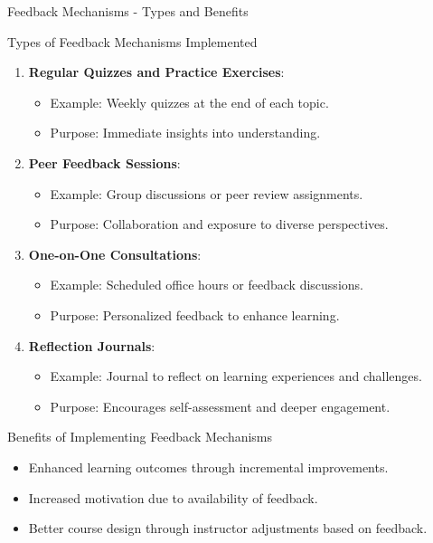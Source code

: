 \documentclass[aspectratio=169]{beamer}
\begin{document}
\begin{frame}[fragile]{Feedback Mechanisms - Types and Benefits}
    \begin{block}{Types of Feedback Mechanisms Implemented}
        \begin{enumerate}
            \item \textbf{Regular Quizzes and Practice Exercises}:
                \begin{itemize}
                    \item Example: Weekly quizzes at the end of each topic.
                    \item Purpose: Immediate insights into understanding.
                \end{itemize}
                
            \item \textbf{Peer Feedback Sessions}:
                \begin{itemize}
                    \item Example: Group discussions or peer review assignments.
                    \item Purpose: Collaboration and exposure to diverse perspectives.
                \end{itemize}
                
            \item \textbf{One-on-One Consultations}:
                \begin{itemize}
                    \item Example: Scheduled office hours or feedback discussions.
                    \item Purpose: Personalized feedback to enhance learning.
                \end{itemize}
                
            \item \textbf{Reflection Journals}:
                \begin{itemize}
                    \item Example: Journal to reflect on learning experiences and challenges.
                    \item Purpose: Encourages self-assessment and deeper engagement.
                \end{itemize}
        \end{enumerate}
    \end{block}
    
    \begin{block}{Benefits of Implementing Feedback Mechanisms}
        \begin{itemize}
            \item Enhanced learning outcomes through incremental improvements.
            \item Increased motivation due to availability of feedback.
            \item Better course design through instructor adjustments based on feedback.
        \end{itemize}
    \end{block}
\end{frame}
\end{document}
